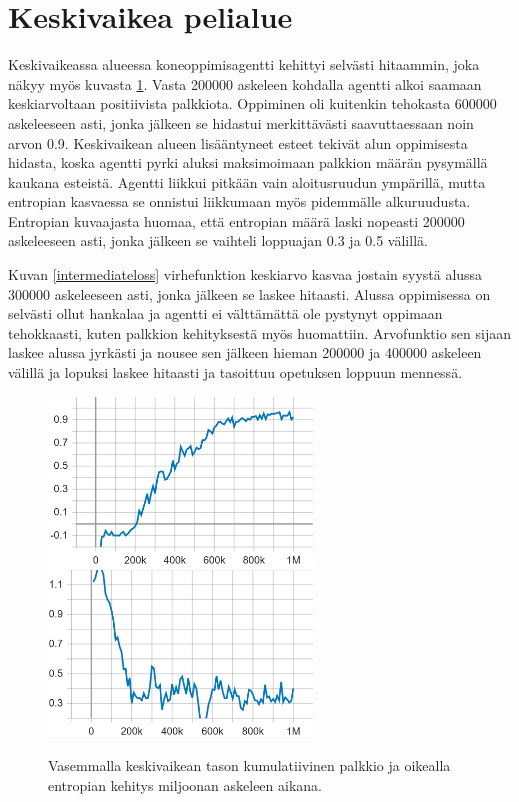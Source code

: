 \documentclass[utf8]{gradu3}
\begin{document}
\section{Keskivaikea pelialue}
\label{keskivaikea}

Keskivaikeassa alueessa koneoppimisagentti kehittyi selvästi hitaammin, joka näkyy myös kuvasta \ref{intermediatecumulativeentropy}. Vasta 200000 askeleen kohdalla agentti alkoi saamaan keskiarvoltaan positiivista palkkiota. Oppiminen oli kuitenkin tehokasta 600000 askeleeseen asti, jonka jälkeen se hidastui merkittävästi saavuttaessaan noin arvon 0.9. Keskivaikean alueen lisääntyneet esteet tekivät alun oppimisesta hidasta, koska agentti pyrki aluksi maksimoimaan palkkion määrän pysymällä kaukana esteistä. Agentti liikkui pitkään vain aloitusruudun ympärillä, mutta entropian kasvaessa se onnistui liikkumaan myös pidemmälle alkuruudusta. Entropian kuvaajasta huomaa, että entropian määrä laski nopeasti 200000 askeleeseen asti, jonka jälkeen se vaihteli loppuajan 0.3 ja 0.5 välillä.

Kuvan \ref{intermediateloss} virhefunktion keskiarvo kasvaa jostain syystä alussa 300000 askeleeseen asti, jonka jälkeen se laskee hitaasti. Alussa oppimisessa on selvästi ollut hankalaa ja agentti ei välttämättä ole pystynyt oppimaan tehokkaasti, kuten palkkion kehityksestä myös huomattiin. Arvofunktio sen sijaan laskee alussa jyrkästi ja nousee sen jälkeen hieman 200000 ja 400000 askeleen välillä ja lopuksi laskee hitaasti ja tasoittuu opetuksen loppuun mennessä.

\begin{figure}[h]
\includegraphics[width=7cm]{I_Cumulative_Reward.png}
\includegraphics[width=7cm]{I_Policy_Entropy.png}
\caption{Vasemmalla keskivaikean tason kumulatiivinen palkkio ja oikealla entropian kehitys miljoonan askeleen aikana.}
\label{intermediatecumulativeentropy}
\end{figure}
\end{document}
